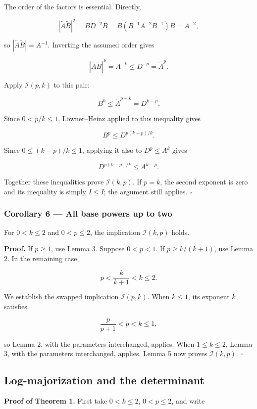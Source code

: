 \documentclass[10pt,a4paper]{article}
\begin{document}
The order of the factors is essential. Directly,

\[
|\widetilde A\widetilde B|^2
=BD^{-2}B
=B(B^{-1}A^{-2}B^{-1})B
=A^{-2},
\]

so \(|\widetilde A\widetilde B|=A^{-1}\). Inverting the assumed order
gives

\[
|\widetilde A\widetilde B|^k=A^{-k}
\le D^{-p}=\widetilde A^p.
\]

Apply \(\mathcal I(p,k)\) to this pair:

\[
B^k\le\widetilde A^{p-k}=D^{k-p}.
\]

Since \(0<p/k\le1\), Löwner--Heinz applied to this inequality gives

\[
B^p\le D^{p(k-p)/k}.
\]

Since \(0\le(k-p)/k\le1\), applying it also to \(D^p\le A^k\) gives

\[
D^{p(k-p)/k}\le A^{k-p}.
\]

Together these inequalities prove \(\mathcal I(k,p)\). If \(p=k\), the
second exponent is zero and its inequality is simply \(I\le I\); the
argument still applies. \(\square\)

\subsubsection{Corollary 6 --- All base powers up to
two}\label{corollary-6-all-base-powers-up-to-two}

For \(0<k\le2\) and \(0<p\le2\), the implication \(\mathcal I(k,p)\)
holds.

\textbf{Proof.} If \(p\ge1\), use Lemma 3. Suppose \(0<p<1\). If
\(p\ge k/(k+1)\), use Lemma 2. In the remaining case,

\[
p<\frac{k}{k+1}<k\le2.
\]

We establish the swapped implication \(\mathcal I(p,k)\). When
\(k\le1\), its exponent \(k\) satisfies

\[
\frac{p}{p+1}<p<k\le1,
\]

so Lemma 2, with the parameters interchanged, applies. When
\(1\le k\le2\), Lemma 3, with the parameters interchanged, applies.
Lemma 5 now proves \(\mathcal I(k,p)\). \(\square\)

\subsection{Log-majorization and the
determinant}\label{log-majorization-and-the-determinant}

\textbf{Proof of Theorem 1.} First take \(0<k\le2\), \(0<p\le2\), and
write
\end{document}
